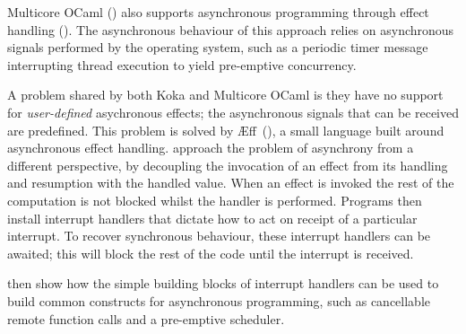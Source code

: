 \documentclass[msc,deptreport,cs]{infthesis} %
\newcommand\aeff{{\AE}ff\xspace}
\newcommand{\todo}[1]
           {{\par\noindent\small\color{RoyalPurple}
  \framebox{\parbox{\dimexpr\linewidth-2\fboxsep-2\fboxrule}
    {\textbf{TODO:} #1}}}}
\begin{document}
Multicore OCaml (\cite{dolan2014multicore}) also supports asynchronous
programming through effect handling (\cite{dolan2017concurrent}). The asynchronous behaviour of this approach relies on asynchronous signals performed by the operating system, such as a periodic \textsf{timer} message interrupting thread execution to yield pre-emptive concurrency.


A problem shared by both Koka and Multicore OCaml is they have no support for
\emph{user-defined} asychronous effects; the asynchronous signals that can be
received are predefined. This problem is solved by
\aeff~(\cite{ahman2020asynchronous}), a small language built around asynchronous
effect handling. \citeauthor{ahman2020asynchronous} approach the problem of
asynchrony from a different perspective, by decoupling the invocation of an
effect from its handling and resumption with the handled value. When an effect
is invoked the rest of the computation is not blocked whilst the handler is
performed. Programs then install interrupt handlers that dictate how to act on
receipt of a particular interrupt. To recover synchronous behaviour, these
interrupt handlers can be \textsf{await}ed; this will block the rest of the code
until the interrupt is received.

\citeauthor{ahman2020asynchronous} then show how the simple building blocks of
interrupt handlers can be used to build common constructs for asynchronous
programming, such as cancellable remote function calls and a pre-emptive
scheduler.


%


\end{document}
